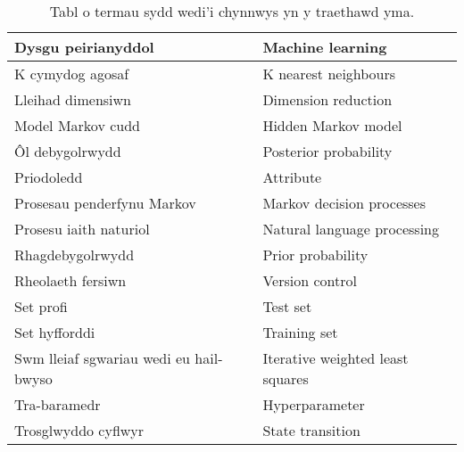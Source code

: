 \begin{table}[htbt!]
\begin{center}
{\begin{tabular}{| p{} | p{} |}
\hline
Dysgu peirianyddol & Machine learning \\
\hline
K cymydog agosaf & K nearest neighbours\\
\hline
Lleihad dimensiwn & Dimension reduction \\
\hline
Model Markov cudd & Hidden Markov model \\
\hline
\^{O}l debygolrwydd & Posterior probability \\
\hline
Priodoledd & Attribute \\
\hline
Prosesau penderfynu Markov & Markov decision processes \\
\hline
Prosesu iaith naturiol & Natural language processing \\
\hline
Rhagdebygolrwydd & Prior probability \\
\hline
Rheolaeth fersiwn & Version control \\
\hline
Set profi & Test set \\
\hline
Set hyfforddi & Training set \\
\hline
Swm lleiaf sgwariau wedi eu hail-bwyso & Iterative weighted least squares \\
\hline
Tra-baramedr & Hyperparameter \\
\hline
Trosglwyddo cyflwyr & State transition \\
\hline
\end{tabular}%
}
\end{center}
\caption{Tabl o termau sydd wedi'i chynnwys yn y traethawd yma.}
\end{table}

